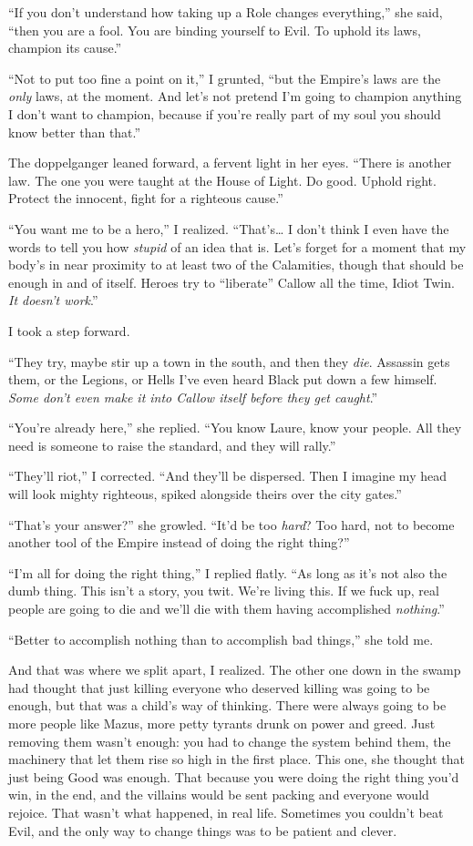 \documentclass[12pt, openany]{book}
\begin{document}
“If you don’t understand how taking up a Role changes everything,” she said, “then you are a fool. You are binding yourself to Evil. To uphold its laws, champion its cause.”

“Not to put too fine a point on it,” I grunted, “but the Empire’s laws are the \textit{only} laws, at the moment. And let’s not pretend I’m going to champion anything I don’t want to champion, because if you’re really part of my soul you should know better than that.”

The doppelganger leaned forward, a fervent light in her eyes. “There is another law. The one you were taught at the House of Light. Do good. Uphold right. Protect the innocent, fight for a righteous cause.”

“You want me to be a hero,” I realized. “That’s… I don’t think I even have the words to tell you how \textit{stupid} of an idea that is. Let’s forget for a moment that my body’s in near proximity to at least two of the Calamities, though that should be enough in and of itself. Heroes try to “liberate” Callow all the time, Idiot Twin. \textit{It doesn’t work}.”

I took a step forward.

“They try, maybe stir up a town in the south, and then they \textit{die}. Assassin gets them, or the Legions, or Hells I’ve even heard Black put down a few himself. \textit{Some don’t even make it into Callow itself before they get caught}.”

“You’re already here,” she replied. “You know Laure, know your people. All they need is someone to raise the standard, and they will rally.”

“They’ll riot,” I corrected. “And they’ll be dispersed. Then I imagine my head will look mighty righteous, spiked alongside theirs over the city gates.”

“That’s your answer?” she growled. “It’d be too \textit{hard}? Too hard, not to become another tool of the Empire instead of doing the right thing?”

“I’m all for doing the right thing,” I replied flatly. “As long as it’s not also the dumb thing. This isn’t a story, you twit. We’re living this. If we fuck up, real people are going to die and we’ll die with them having accomplished \textit{nothing}.”

“Better to accomplish nothing than to accomplish bad things,” she told me.

And that was where we split apart, I realized. The other one down in the swamp had thought that just killing everyone who deserved killing was going to be enough, but that was a child’s way of thinking. There were always going to be more people like Mazus, more petty tyrants drunk on power and greed. Just removing them wasn’t enough: you had to change the system behind them, the machinery that let them rise so high in the first place. This one, she thought that just being Good was enough. That because you were doing the right thing you’d win, in the end, and the villains would be sent packing and everyone would rejoice. That wasn’t what happened, in real life. Sometimes you couldn’t beat Evil, and the only way to change things was to be patient and clever.
\end{document}
